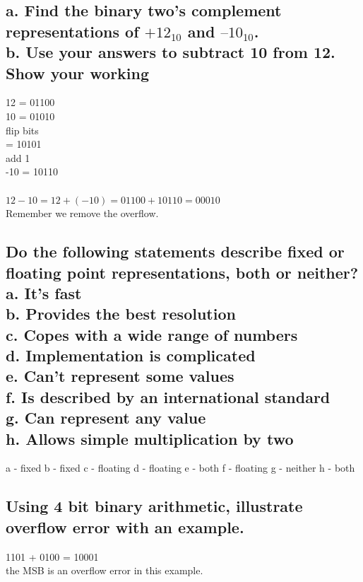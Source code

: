 \documentclass{article}
\begin{document}
\subsection{a. Find the binary two’s complement representations of $+12_{10}$
and $–10_{10}$.\\
b. Use your answers to subtract 10 from 12. Show your
working}
12 = 01100\\
10 = 01010\\
flip bits\\
   = 10101\\
add 1\\
-10 = 10110\\
\\
$12-10 = 12 + (-10)  = 01100 + 10110 = 00010$\\
Remember we remove the overflow.

\subsection{Do the following statements describe fixed or floating point
representations, both or neither?\\
a. It’s fast\\
b. Provides the best resolution\\
c. Copes with a wide range of numbers\\
d. Implementation is complicated\\
e. Can’t represent some values\\
f. Is described by an international standard\\
g. Can represent any value\\
h. Allows simple multiplication by two}
a - fixed
b - fixed
c - floating
d - floating
e - both
f - floating
g - neither
h - both

\subsection{Using 4 bit binary arithmetic, illustrate overflow error with an example. }
1101 + 0100 = 10001\\
the MSB is an overflow error in this example.
\newpage
\end{document}
